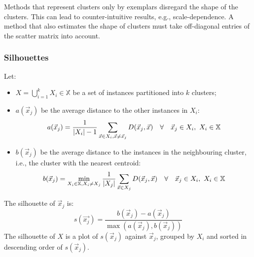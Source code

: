 Methods that represent clusters only by exemplars disregard the shape of the
clusters.
This can lead to counter-intuitive results, e.g., scale-dependence.
A method that also estimates the shape of clusters must take off-diagonal
entries of the scatter matrix into account.

\subsubsection{Silhouettes}

\begin{dfn}
  [Silhouette]
  Let:
  \begin{itemize}
    \item $X = \bigcup_{i = 1}^{k} X_i \in \mathbb{X}$ be a set of instances
          partitioned into $k$ clusters;
    \item $a(\vec{x}_j)$ be the average distance to the other instances in $X_i$:
          \begin{equation}
            a(\vec{x}_j) =
            \frac{1}{|X_i| - 1}
            \sum_{\vec{x} \in X_i, \vec{x} \neq \vec{x}_j} D(\vec{x}_j, \vec{x})
            \quad\forall\quad
            \vec{x}_j \in X_i,\ X_i \in \mathbb{X}
          \end{equation}
    \item $b(\vec{x}_j)$ be the average distance to the instances in the
          neighbouring cluster, i.e., the cluster with the nearest centroid:
          \begin{equation}
            b(\vec{x}_j) =
            \min_{X_i \in \mathbb{X}, X_i \neq X_j}
            \frac{1}{|X_j|}
            \sum_{\vec{x} \in X_j} D(\vec{x}_j, \vec{x})
            \quad\forall\quad
            \vec{x}_j \in X_i,\ X_i \in \mathbb{X}
          \end{equation}
  \end{itemize}
  The silhouette of $\vec{x}_j$ is:
  \begin{equation}
    s(\vec{x_j}) =
    \frac{b(\vec{x}_j) - a(\vec{x}_j)}{\max(a(\vec{x}_j), b(\vec{x}_j))}
  \end{equation}
  The silhouette of $X$ is a plot of $s(\vec{x}_j)$ against
  $\vec{x}_j$, grouped by $X_i$ and sorted in descending order of
  $s(\vec{x}_j)$.
\end{dfn}